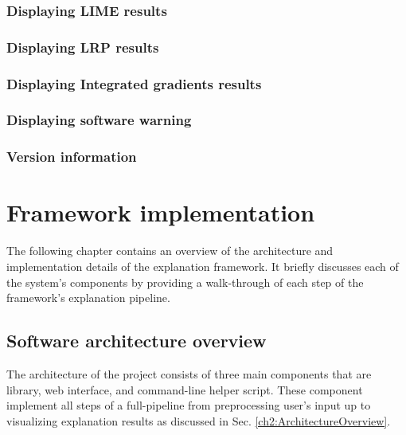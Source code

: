 \documentclass[
    bindingoffset=5mm,  %
    footnoteindent=3mm, %
    hyphenation=true    %
]{src/wut-thesis}
\begin{document}
\subsubsection{Displaying LIME results}
\subsubsection{Displaying LRP results}
\subsubsection{Displaying Integrated gradients results}
\subsubsection{Displaying software warning} \label{ch4:NotificationPanel}
\subsubsection{Version information}

%
%
\clearpage %
\section{Framework implementation} \label{ch:implementation}

    The following chapter contains an overview of the architecture and implementation details of the explanation framework. It briefly discusses each of the system's components by providing
    a walk-through of each step of the framework's explanation pipeline.

\subsection{Software architecture overview}

    The architecture of the project consists of three main components that are library, web interface, and command-line helper script.
    These component implement all steps of a full-pipeline from preprocessing
    user's input up to visualizing explanation results as discussed in Sec. \ref{ch2:ArchitectureOverview}.
\end{document}
